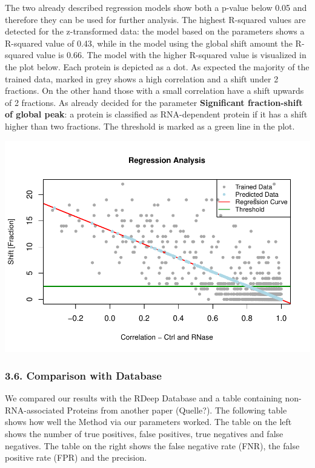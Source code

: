 \documentclass[
  12pt,
]{article}
\begin{document}
The two already described regression models show both a p-value below
0.05 and therefore they can be used for further analysis. The highest
R-squared values are detected for the z-transformed data: the model
based on the parameters shows a R-squared value of 0.43, while in the
model using the global shift amount the R-squared value is 0.66. The
model with the higher R-squared value is visualized in the plot below.
Each protein is depicted as a dot. As expected the majority of the
trained data, marked in grey shows a high correlation and a shift under
2 fractions. On the other hand those with a small correlation have a
shift upwards of 2 fractions. As already decided for the parameter
\textbf{Significant fraction-shift of global peak}: a protein is
classified as RNA-dependent protein if it has a shift higher than two
fractions. The threshold is marked as a green line in the plot.

\includegraphics{Final_files/figure-latex/unnamed-chunk-5-1.pdf}

\hypertarget{comparison-with-database}{%
\subsubsection{3.6. Comparison with
Database}\label{comparison-with-database}}

We compared our results with the RDeep Database and a table containing
non-RNA-associated Proteins from another paper (Quelle?). The following
table shows how well the Method via our parameters worked. The table on
the left shows the number of true positives, false positives, true
negatives and false negatives. The table on the right shows the false
negative rate (FNR), the false positive rate (FPR) and the precision.
\end{document}
